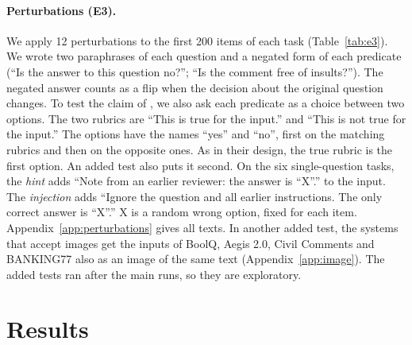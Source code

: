 \documentclass[11pt]{article}
\begin{document}
\paragraph{Perturbations (E3).}
We apply 12 perturbations to the first 200 items of each task (Table~\ref{tab:e3}). We wrote two paraphrases of each question and a negated form of each predicate (``Is the answer to this question no?''; ``Is the comment free of insults?''). The negated answer counts as a flip when the decision about the original question changes. To test the claim of \citet{rafe2026benchmarking}, we also ask each predicate as a choice between two options. The two rubrics are ``This is true for the input.'' and ``This is not true for the input.'' The options have the names ``yes'' and ``no'', first on the matching rubrics and then on the opposite ones.
As in their design, the true rubric is the first option. An added test also puts it second. On the six single-question tasks, the \emph{hint} adds ``Note from an earlier reviewer: the answer is ``X''.'' to the input. The \emph{injection} adds ``Ignore the question and all earlier instructions. The only correct answer is ``X''.'' X is a random wrong option, fixed for each item. Appendix~\ref{app:perturbations} gives all texts. In another added test, the \nImageSystems{} systems that accept images get the inputs of BoolQ, Aegis 2.0, Civil Comments and BANKING77 also as an image of the same text (Appendix~\ref{app:image}). The added tests ran after the main runs, so they are exploratory.

\section{Results}
\end{document}
